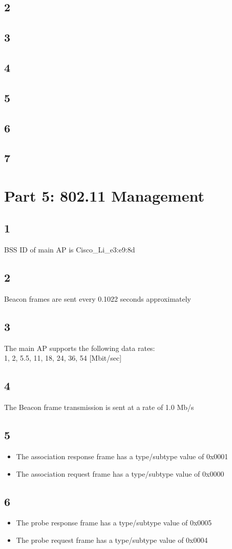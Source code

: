 \documentclass{article}
\begin{document}
    \subsection*{2}
    \subsection*{3}
    \subsection*{4}
    \subsection*{5}
    \subsection*{6}
    \subsection*{7}
    \section*{Part 5: 802.11 Management}
    \subsection*{1}
        BSS ID of main AP is Cisco_Li_e3:e9:8d
    \subsection*{2}
        Beacon frames are sent every 0.1022 seconds approximately
    \subsection*{3}
        The main AP supports the following data rates:\\
        1, 2, 5.5, 11, 18, 24, 36, 54 [Mbit/sec]
    \subsection*{4}
        The Beacon frame transmission is sent at a rate of 1.0 Mb/s
    \subsection*{5}
        \begin{itemize}
            \item The association response frame has a type/subtype value of 0x0001
            \item The association request frame has a type/subtype value of 0x0000
        \end{itemize}
    \subsection*{6}
        \begin{itemize}
            \item The probe response frame has a type/subtype value of 0x0005
            \item The probe request frame has a type/subtype value of 0x0004
        \end{itemize}
\end{document}
